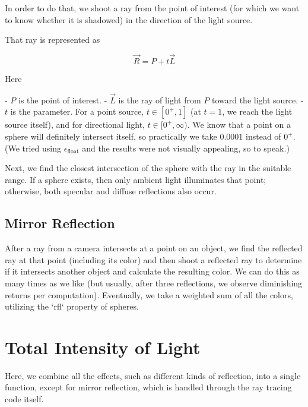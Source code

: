 \documentclass[conference]{IEEEtran}
\begin{document}
In order to do that, we shoot a ray from the point of interest (for which we want to know whether it is shadowed) in the direction of the light source.

That ray is represented as 

$$\vec{R} = P + t \vec{L}$$

Here

- $P$ is the point of interest.
- $\vec{L}$ is the ray of light from $P$ toward the light source.
- $t$ is the parameter. For a point source, $t \in [0^+, 1]$ (at $t = 1$, we reach the light source itself), and for directional light, $t \in [0^+, \infty)$. We know that a point on a sphere will definitely intersect itself, so practically we take $0.0001$ instead of $0^+$. (We tried using $\epsilon_{\text{float}}$ and the results were not visually appealing, so to speak.)

Next, we find the closest intersection of the sphere with the ray in the suitable range. If a sphere exists, then only ambient light illuminates that point; otherwise, both specular and diffuse reflections also occur.

\subsection{Mirror Reflection}

After a ray from a camera intersects at a point on an object, we find the reflected ray at that point (including its color) and then shoot a reflected ray to determine if it intersects another object and calculate the resulting color. We can do this as many times as we like (but usually, after three reflections, we observe diminishing returns per computation). Eventually, we take a weighted sum of all the colors, utilizing the `rfl` property of spheres.

\section{Total Intensity of Light}

Here, we combine all the effects, such as different kinds of reflection, into a single function, except for mirror reflection, which is handled through the ray tracing code itself.
\end{document}
